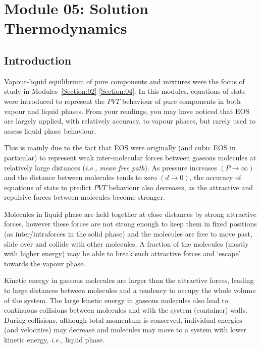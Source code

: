 \documentclass[12pts,a4paper,amsmath,amssymb,floatfix]{article}%
\newcommand{\ie}{{\it i.e., }}
\begin{document}
\section{Module 05: Solution Thermodynamics}\label{Section:05}

\subsection{Introduction}\label{Section:05:Introduction}
Vapour-liquid equilibrium of pure components and mixtures were the focus of study in Modules~\ref{Section:02}-\ref{Section:04}. In this modules, equations of state were introduced to represent the $PVT$ behaviour of pure components in both vapour and liquid phases. From your readings, you may have noticed that EOS are largely applied, with relatively accuracy, to vapour phases, but rarely used to assess liquid phase behaviour. 

This is mainly due to the fact that EOS were originally (and cubic EOS in particular) to represent weak inter-molecular forces between gaseous molecules at relatively large distances (\ie {\it mean free path}). As pressure increases $\left(P\rightarrow \infty\right)$ and the distance between molecules tends to zero $\left(d\rightarrow 0\right)$, the accuracy of equations of state to predict $PVT$ behaviour also decreases, as the attractive and repulsive forces between molecules become stronger. 

Molecules in liquid phase are held together at close distances by strong attractive forces, however these forces are not strong enough to keep them in fixed positions (as inter/intraforces in the solid phase) and the molecules are free to move past, slide over and collide with other molecules. A fraction of the molecules (mostly with higher energy) may be able to break such attractive forces and `escape' towards the vapour phase. 

Kinetic energy in gaseous molecules are larger than the attractive forces, leading to large distances between molecules and a tendency to occupy the whole volume of the system. The large kinetic energy in gaseous molecules also lead to continuous collisions between molecules and with the system (container) walls. During collisions, although total momentum is conserved, individual energies (and velocities) may decrease and molecules may move to a system with lower kinetic energy, \ie liquid phase.

\bigskip
\end{document}

